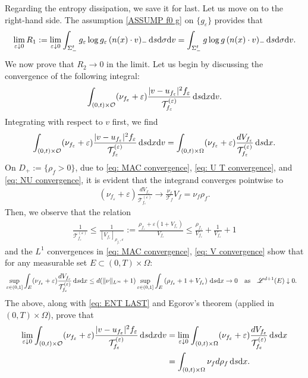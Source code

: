 \documentclass[10pt, reqno]{amsart}
\theoremstyle{plain}
\theoremstyle{definition}
\theoremstyle{remark}
\numberwithin{equation}{section}
\newcommand{\calO}{\mathcal O}
\newcommand{\calT}{\mathcal T}
\newcommand{\scrL}{\mathscr L}
\newcommand{\ve}{\varepsilon}
\newcommand{\dx}{\textnormal{d}x}
\newcommand{\dv}{\textnormal{d}v}
\newcommand{\ds}{\textnormal{d}s}
\newcommand{\tnd}{\textnormal{d}}
\newcommand{\lt}{\left}
\newcommand{\rt}{\right}
\newcommand{\renorm}[3]{\lt[#1\rt]_{#2 , #3}}
\begin{document}
Regarding the entropy dissipation, we save it for last. Let us move on to the right-hand side. The assumption \eqref{ASSUMP f0 g} on $\{g_\ve\}$ provides that
\begin{align*}
    \lim_{\ve\downarrow 0} R_1 := \lim_{\ve\downarrow 0} \int_{\Sigma_-^t} g_\ve \log g_\ve \, (n(x)\cdot v)_- \,\ds\tnd\sigma\dv = \int_{\Sigma_-^t} g \log g \, (n(x)\cdot v)_- \,\ds\tnd\sigma\dv.
\end{align*}
We now prove that $R_2\to 0$ in the limit. Let us begin by discussing the convergence of the following integral:
\begin{align*}
    \int_{(0,t)\times\calO} (\nu_{f_\ve} + \ve) \frac{|v-u_{f_\ve}|^2 f_\ve}{\calT_{f_\ve}^{(\ve)}} \,\ds\dx\dv.
\end{align*}
Integrating with respect to $v$ first, we find
\begin{align*}
    \int_{(0,t)\times\calO} (\nu_{f_\ve} + \ve) \frac{|v-u_{f_\ve}|^2 f_\ve}{\calT_{f_\ve}^{(\ve)}} \,\ds\dx\dv = \int_{(0,t)\times \Omega} (\nu_{f_\ve} + \ve) \frac{dV_{f_\ve}}{\calT_{f_\ve}^{(\ve)}} \,\ds\dx.
\end{align*}
On $D_+ := \{\rho_f > 0\}$, due to \eqref{eq: MAC convergence}, \eqref{eq: U T convergence}, and \eqref{eq: NU convergence}, it is evident that the integrand converges pointwise to
\begin{align}\label{eq: ENT LAST}
    (\nu_{f_\ve} + \ve) \frac{dV_{f_\ve}}{\calT_{f_\ve}^{(\ve)}} \to \frac{\nu_f}{\calT_f} V_f = \nu_f \rho_f.
\end{align}
Then, we observe that the relation
\begin{align*}
    \frac{1}{\calT_{f_\ve}^{(\ve)}} \le \frac{1}{\renorm{V_{f_\ve}}{\rho_{f_\ve}}{\ve}} := \frac{\rho_{f_\ve} + \ve(1 + V_{f_\ve})}{V_{f_\ve}} \le \frac{\rho_{f_\ve}}{V_{f_\ve}} + \frac{1}{V_{f_\ve}} + 1
\end{align*}
and the $L^1$ convergences in \eqref{eq: MAC convergence}, \eqref{eq: V convergence} show that for any measurable set $E\subset (0,T)\times \Omega$:
\begin{align*}
    &\sup_{\ve\in (0,1]} \int_E (\nu_{f_\ve} + \ve) \frac{dV_{f_\ve}}{\calT_{f_\ve}^{(\ve)}} \,\ds\dx  \le d(\|\nu\|_{L^\infty} + 1)   \sup_{\ve \in (0,1]} \int_E \lt( \rho_{f_\ve} + 1 + V_{f_\ve} \rt) \,\ds\dx  \to 0 \quad \text{as} \quad \scrL^{d+1}(E)\downarrow 0.
\end{align*}
The above, along with \eqref{eq: ENT LAST} and Egorov's theorem (applied in $(0,T)\times \Omega$), prove that
\begin{equation}\label{eq: ENT LAST 1}
\begin{split}
    \lim_{\ve\downarrow 0} \int_{(0,t)\times \calO} (\nu_{f_\ve} + \ve) \frac{|v-u_{f_\ve}|^2 f_\ve}{\calT_{f_\ve}^{(\ve)}} \,\ds\dx\dv  &= \lim_{\ve\downarrow 0} \int_{(0,t)\times \Omega} (\nu_{f_\ve} + \ve) \frac{d V_{f_\ve}}{\calT_{f_\ve}^{(\ve)}} \,\ds\dx \\
    &= \int_{(0,t)\times \Omega} \nu_f d\rho_f \,\ds\dx.
\end{split}
\end{equation}
\end{document}
